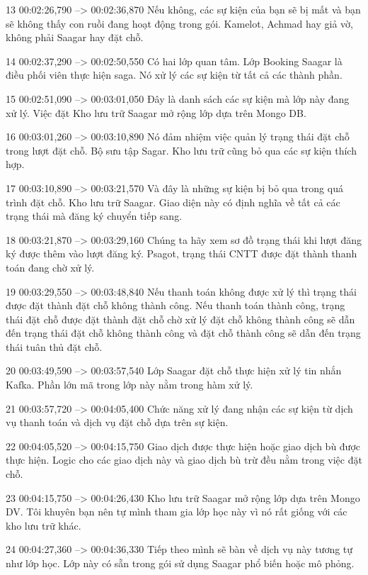 13
00:02:26,790 --> 00:02:36,870
Nếu không, các sự kiện của bạn sẽ bị mất và bạn sẽ không thấy con ruồi đang hoạt động trong gói.  Kamelot, Achmad hay giả vờ, không phải Saagar hay đặt chỗ.

14
00:02:37,290 --> 00:02:50,550
Có hai lớp quan tâm.  Lớp Booking Saagar là điều phối viên thực hiện saga.  Nó xử lý các sự kiện từ tất cả các thành phần.

15
00:02:51,090 --> 00:03:01,050
Đây là danh sách các sự kiện mà lớp này đang xử lý.  Việc đặt Kho lưu trữ Saagar mở rộng lớp dựa trên Mongo DB.

16
00:03:01,260 --> 00:03:10,890
Nó đảm nhiệm việc quản lý trạng thái đặt chỗ trong lượt đặt chỗ.  Bộ sưu tập Sagar.  Kho lưu trữ cũng bỏ qua các sự kiện thích hợp.

17
00:03:10,890 --> 00:03:21,570
Và đây là những sự kiện bị bỏ qua trong quá trình đặt chỗ.  Kho lưu trữ Saagar.  Giao diện này có định nghĩa về tất cả các trạng thái mà đăng ký chuyển tiếp sang.

18
00:03:21,870 --> 00:03:29,160
Chúng ta hãy xem sơ đồ trạng thái khi lượt đăng ký được thêm vào lượt đăng ký.  Psagot, trạng thái CNTT được đặt thành thanh toán đang chờ xử lý.

19
00:03:29,550 --> 00:03:48,840
Nếu thanh toán không được xử lý thì trạng thái được đặt thành đặt chỗ không thành công.  Nếu thanh toán thành công, trạng thái đặt chỗ được đặt thành đặt chỗ chờ xử lý đặt chỗ không thành công sẽ dẫn đến trạng thái đặt chỗ không thành công và đặt chỗ thành công sẽ dẫn đến trạng thái tuân thủ đặt chỗ.

20
00:03:49,590 --> 00:03:57,540
Lớp Saagar đặt chỗ thực hiện xử lý tin nhắn Kafka.  Phần lớn mã trong lớp này nằm trong hàm xử lý.

21
00:03:57,720 --> 00:04:05,400
Chức năng xử lý đang nhận các sự kiện từ dịch vụ thanh toán và dịch vụ đặt chỗ dựa trên sự kiện.

22
00:04:05,520 --> 00:04:15,750
Giao dịch được thực hiện hoặc giao dịch bù được thực hiện.  Logic cho các giao dịch này và giao dịch bù trừ đều nằm trong việc đặt chỗ.

23
00:04:15,750 --> 00:04:26,430
Kho lưu trữ Saagar mở rộng lớp dựa trên Mongo DV.  Tôi khuyên bạn nên tự mình tham gia lớp học này vì nó rất giống với các kho lưu trữ khác.

24
00:04:27,360 --> 00:04:36,330
Tiếp theo mình sẽ bàn về dịch vụ này tương tự như lớp học.  Lớp này có sẵn trong gói sử dụng Saagar phổ biến hoặc mô phỏng.

